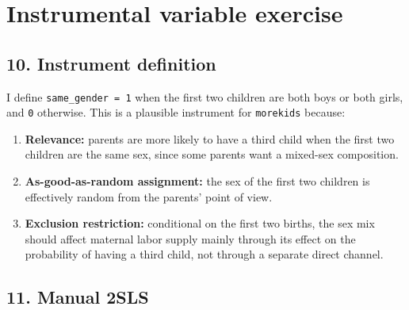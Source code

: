 \documentclass[
]{article}
\providecommand{\tightlist}{%
  \setlength{\itemsep}{0pt}\setlength{\parskip}{0pt}}
\begin{document}
\section{Instrumental variable
exercise}\label{instrumental-variable-exercise}

\subsection{10. Instrument definition}\label{instrument-definition}

I define \texttt{same\_gender\ =\ 1} when the first two children are
both boys or both girls, and \texttt{0} otherwise. This is a plausible
instrument for \texttt{morekids} because:

\begin{enumerate}
\def\labelenumi{\arabic{enumi}.}
\tightlist
\item
  \textbf{Relevance:} parents are more likely to have a third child when
  the first two children are the same sex, since some parents want a
  mixed-sex composition.
\item
  \textbf{As-good-as-random assignment:} the sex of the first two
  children is effectively random from the parents' point of view.
\item
  \textbf{Exclusion restriction:} conditional on the first two births,
  the sex mix should affect maternal labor supply mainly through its
  effect on the probability of having a third child, not through a
  separate direct channel.
\end{enumerate}

\subsection{11. Manual 2SLS}\label{manual-2sls}
\end{document}

